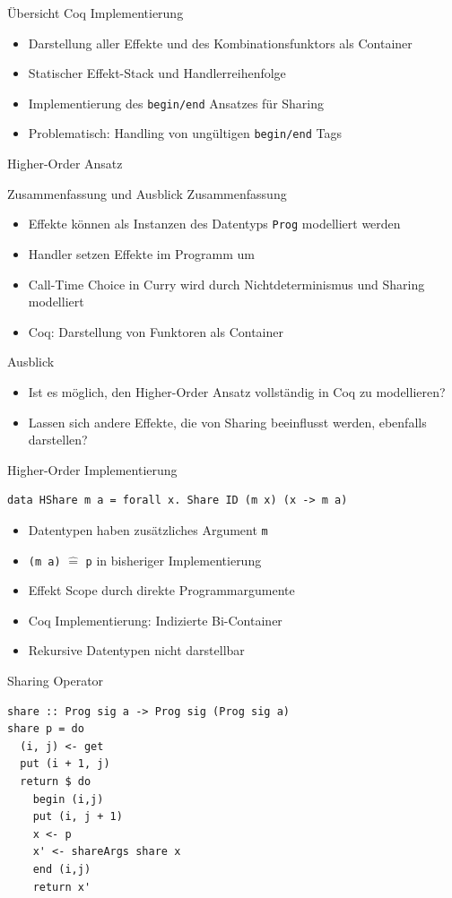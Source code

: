 \documentclass{beamer}
\newcommand{\haskellinline}[1]{\texttt{#1}}
\begin{document}
\begin{frame}[fragile]{Übersicht Coq Implementierung}
\begin{itemize}
\item Darstellung aller Effekte und des Kombinationsfunktors als Container
\item Statischer Effekt-Stack und Handlerreihenfolge
\item Implementierung des \texttt{begin/end} Ansatzes für Sharing
\item Problematisch: Handling von ungültigen \texttt{begin/end} Tags
\end{itemize}
\MVRightArrow{} Higher-Order Ansatz
\end{frame}

\begin{frame}[fragile]{Zusammenfassung und Ausblick}
Zusammenfassung
\begin{itemize}
\item Effekte können als Instanzen des Datentyps \haskellinline{Prog} modelliert werden
\item Handler setzen Effekte im Programm um
\item Call-Time Choice in Curry wird durch Nichtdeterminismus und Sharing modelliert
\item Coq: Darstellung von Funktoren als Container
\end{itemize}
\vfill
Ausblick
\begin{itemize}
\item Ist es möglich, den Higher-Order Ansatz vollständig in Coq zu modellieren?
\item Lassen sich andere Effekte, die von Sharing beeinflusst werden, ebenfalls darstellen?
\end{itemize}
\end{frame}

\appendix

\begin{frame}[fragile]{Higher-Order Implementierung}
\begin{verbatim}
data HShare m a = forall x. Share ID (m x) (x -> m a)
\end{verbatim}
\begin{itemize}
\item Datentypen haben zusätzliches Argument \texttt{m}
\item \texttt{(m a)} $\hat{=}$ \texttt{p} in bisheriger Implementierung
\item Effekt Scope durch direkte Programmargumente
\item Coq Implementierung: Indizierte Bi-Container
\item Rekursive Datentypen nicht darstellbar
\end{itemize}
\end{frame}

\begin{frame}[fragile]{Sharing Operator}
\begin{verbatim}
share :: Prog sig a -> Prog sig (Prog sig a)
share p = do
  (i, j) <- get
  put (i + 1, j)
  return $ do
    begin (i,j)
    put (i, j + 1)
    x <- p
    x' <- shareArgs share x
    end (i,j)
    return x'
\end{verbatim}
\end{frame}
\end{document}
